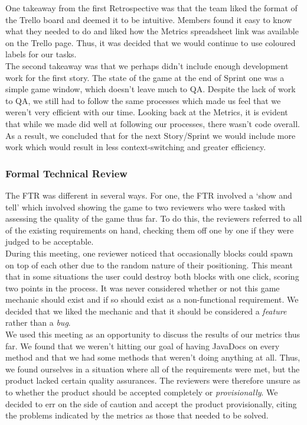 \documentclass[12pt]{article}
\begin{document}
One takeaway from the first Retrospective was that the team liked the format of the Trello board and deemed it to be intuitive. Members found it easy to know what they needed to do and liked how the Metrics spreadsheet link was available on the Trello page. Thus, it was decided that we would continue to use coloured labels for our tasks. \\

The second takeaway was that we perhaps didn't include enough development work for the first story. The state of the game at the end of Sprint one was a simple game window, which doesn't leave much to QA. Despite the lack of work to QA, we still had to follow the same processes which made us feel that we weren't very efficient with our time. Looking back at the Metrics, it is evident that while we made did well at following our processes, there wasn't code overall. As a result, we concluded that for the next Story/Sprint we would include more work which would result in less context-switching and greater efficiency.

\subsubsection{Formal Technical Review}

The FTR was different in several ways. For one, the FTR involved a `show and tell' which involved showing the game to two reviewers who were tasked with assessing the quality of the game thus far. To do this, the reviewers referred to all of the existing requirements on hand, checking them off one by one if they were judged to be acceptable. \\

During this meeting, one reviewer noticed that occasionally blocks could spawn on top of each other due to the random nature of their positioning. This meant that in some situations the user could destroy both blocks with one click, scoring two points in the process. It was never considered whether or not this game mechanic should exist and if so should exist as a non-functional requirement. We decided that we liked the mechanic and that it should be considered a \emph{feature} rather than a \emph{bug}. \\

We used this meeting as an opportunity to discuss the results of our metrics thus far. We found that we weren't hitting our goal of having JavaDocs on every method and that we had some methods that weren't doing anything at all. Thus, we found ourselves in a situation where all of the requirements were met, but the product lacked certain quality assurances. The reviewers were therefore unsure as to whether the product should be accepted completely or \emph{provisionally}. We decided to err on the side of caution and accept the product provisionally, citing the problems indicated by the metrics as those that needed to be solved.
\end{document}
